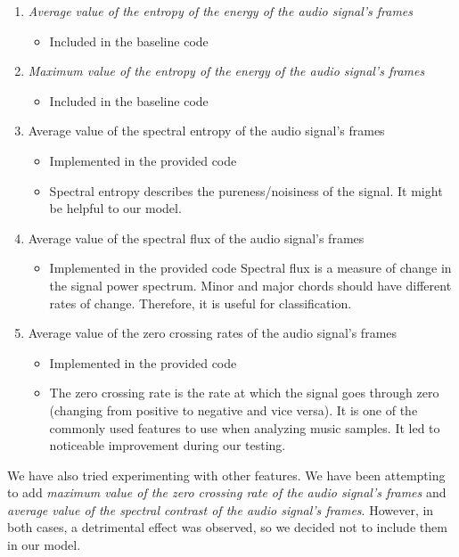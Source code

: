 \documentclass{article}
\begin{document}
\begin{enumerate}
\item \textit{Average value of the entropy of the energy of the audio signal’s frames}
\begin{itemize}
\item Included in the baseline code
\end{itemize}
\item \textit{Maximum value of the entropy of the energy of the audio signal’s frames}
\begin{itemize}
\item Included in the baseline code
\end{itemize}
\item Average value of the spectral entropy of the audio signal’s frames
\begin{itemize}
\item Implemented in the provided code
\item Spectral entropy describes the pureness/noisiness of the signal. It might be helpful to our model.
\end{itemize}
\item Average value of the spectral flux of the audio signal’s frames
\begin{itemize}
\item Implemented in the provided code
Spectral flux is a measure of change in the signal power spectrum. Minor and major chords should have different rates of change. Therefore, it is useful for classification.
\end{itemize}
\item Average value of the zero crossing rates of the audio signal’s frames
\begin{itemize}
\item Implemented in the provided code
\item The zero crossing rate is the rate at which the signal goes through zero (changing from positive to negative and vice versa). It is one of the commonly used features to use when analyzing music samples. It led to noticeable improvement during our testing.
\end{itemize}


\end{enumerate}

We have also tried experimenting with other features. We have been attempting to add \textit{maximum value of the zero crossing rate of the audio signal’s frames} and \textit{average value of the spectral contrast of the audio signal’s frames}. However, in both cases, a detrimental effect was observed, so we decided not to include them in our model.
\end{document}
